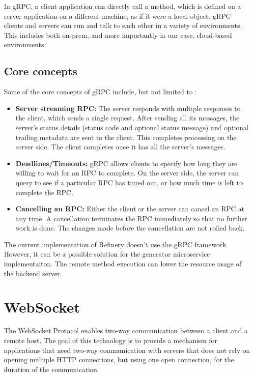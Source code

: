 	In gRPC, a client application can directly call a method, which is defined on a server application on a different machine, as if it were a local object. 
	gRPC clients and servers can run and talk to each other in a variety of environments. This includes both on-prem, and more importantly in our case,
	cloud-based environments.
	\cite{grpcspec}

	\subsection{Core concepts}
	Some of the core concepts of gRPC include, but not limited to \cite{grpcspec2}:
	\begin{itemize}
		\item \textbf{Server streaming RPC:} The server responds with multiple responses to the client, which sends a single request. 
		After sending all its messages, the server’s status details (status code and optional status message) and optional trailing metadata are sent to the client.
		This completes processing on the server side. The client completes once it has all the server’s messages.
		\item \textbf{Deadlines/Timeouts:} gRPC allows clients to specify how long they are willing to wait for an RPC to complete. On the server side, the server can query to see if a particular RPC has timed out, or how much time is left to complete the RPC.
		\item \textbf{Cancelling an RPC:} Either the client or the server can cancel an RPC at any time. A cancellation terminates the RPC immediately so that no further work is done. The changes made before the cancellation are not rolled back.
	\end{itemize}

	The current implementation of Refinery doesn't use the gRPC framework. However, it can be a possible solution for the generator microservice implementaiton. 
	The remote method execution can lower the resource usage of the backend server.

\section{WebSocket} \label{backgrwebsocket}
	The WebSocket Protocol \cite{websocket} enables two-way communication between a client
	and a remote host.
	The goal of
	this technology is to provide a mechanism for applications that need two-way communication with servers that does
	not rely on opening multiple HTTP connections, but using one open connection, for the duration of the communication.


